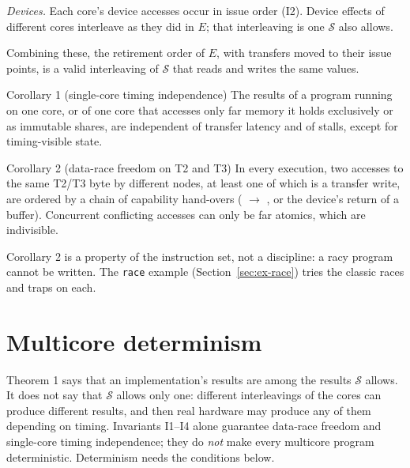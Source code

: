 \emph{Devices.} Each core's device accesses occur in issue order (I2). Device effects of different
cores interleave as they did in $E$; that interleaving is one $\mathcal{S}$ also allows.

Combining these, the retirement order of $E$, with transfers moved to their issue points, is a valid
interleaving of $\mathcal{S}$ that reads and writes the same values. \hfill\qedbox

\begin{rule*}{Corollary 1 (single-core timing independence)}
The results of a program running on one core, or of one core that accesses only far memory it holds
exclusively or as immutable shares, are independent of transfer latency and of stalls, except for
timing-visible state.
\end{rule*}

\begin{rule*}{Corollary 2 (data-race freedom on T2 and T3)}
In every execution, two accesses to the same T2/T3 byte by different nodes, at least one of which is a
transfer write, are ordered by a chain of capability hand-overs ( $\to$ , or
the device's return of a buffer). Concurrent conflicting accesses can only be far atomics, which are
indivisible.
\end{rule*}

Corollary 2 is a property of the instruction set, not a discipline: a racy program cannot be written.
The \texttt{race} example (Section~\ref{sec:ex-race}) tries the classic races and traps on each.

\section{Multicore determinism}\label{sec:determinism}

Theorem 1 says that an implementation's results are among the results $\mathcal{S}$ allows. It does not
say that $\mathcal{S}$ allows only one: different interleavings of the cores can produce different
results, and then real hardware may produce any of them depending on timing. Invariants I1--I4 alone
guarantee data-race freedom and single-core timing independence; they do \emph{not} make every
multicore program deterministic. Determinism needs the conditions below.


